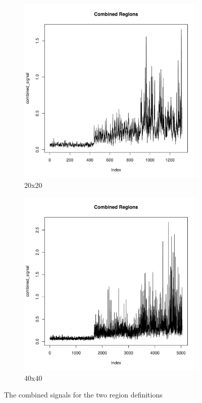 \documentclass[12pt,a4paper,twoside]{article}
\begin{document}
\begin{figure}[!ht]
    \begin{subfigure}{.45\textwidth}
        \centering
        \includegraphics[width=\linewidth]{img/combined_regions_20x20.pdf}
        \caption{20x20}
        \label{fig:observededsignalfig20}
    \end{subfigure}
    \begin{subfigure}{.45\textwidth}
        \centering
        \includegraphics[width=\linewidth]{img/combined_regions_40x40.pdf}
        \caption{40x40}
        \label{fig:observededsignalfig40}
    \end{subfigure}
    \caption{The combined signals for the two region definitions}
    \label{fig:observededsignalfig}
\end{figure}
\end{document}
